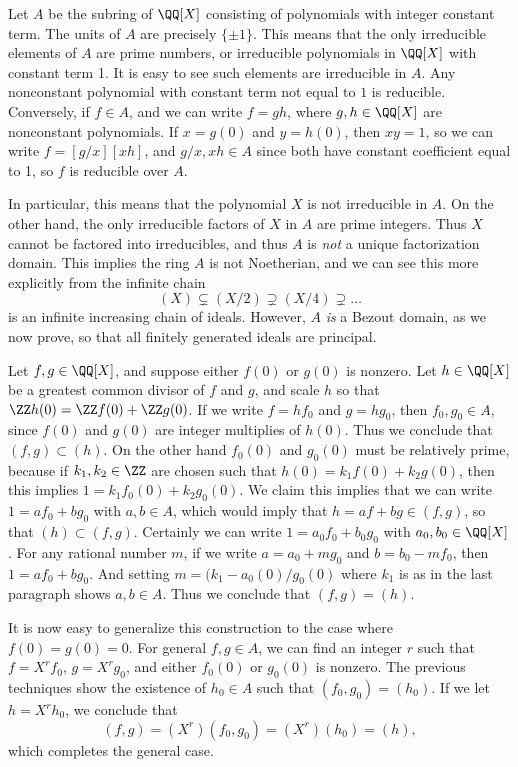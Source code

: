 \begin{example}
    Let $A$ be the subring of $\QQ[X]$ consisting of polynomials with integer constant term. The units of $A$ are precisely $\{ \pm 1 \}$. This means that the only irreducible elements of $A$ are prime numbers, or irreducible polynomials in $\QQ[X]$ with constant term 1. It is easy to see such elements are irreducible in $A$. Any nonconstant polynomial with constant term not equal to $1$ is reducible. Conversely, if $f \in A$, and we can write $f = gh$, where $g,h \in \QQ[X]$ are nonconstant polynomials. If $x = g(0)$ and $y = h(0)$, then $xy = 1$, so we can write $f = [g/x][xh]$, and $g/x,xh \in A$ since both have constant coefficient equal to 1, so $f$ is reducible over $A$.

    In particular, this means that the polynomial $X$ is not irreducible in $A$. On the other hand, the only irreducible factors of $X$ in $A$ are prime integers. Thus $X$ cannot be factored into irreducibles, and thus $A$ is \emph{not} a unique factorization domain. This implies the ring $A$ is not Noetherian, and we can see this more explicitly from the infinite chain
    \[ (X) \subsetneq (X/2) \supsetneq (X/4) \supsetneq \dots \]
    is an infinite increasing chain of ideals. However, $A$ \emph{is} a Bezout domain, as we now prove, so that all finitely generated ideals are principal.

    Let $f,g \in \QQ[X]$, and suppose either $f(0)$ or $g(0)$ is nonzero. Let $h \in \QQ[X]$ be a greatest common divisor of $f$ and $g$, and scale $h$ so that $\ZZ h(0) = \ZZ f(0) + \ZZ g(0)$. If we write $f = hf_0$ and $g = hg_0$, then $f_0, g_0 \in A$, since $f(0)$ and $g(0)$ are integer multiplies of $h(0)$. Thus we conclude that $(f,g) \subset (h)$. On the other hand $f_0(0)$ and $g_0(0)$ must be relatively prime, because if $k_1,k_2 \in \ZZ$ are chosen such that $h(0) = k_1 f(0) + k_2g(0)$, then this implies $1 = k_1 f_0(0) + k_2 g_0(0)$. We claim this implies that we can write $1 = a f_0 + b g_0$ with $a,b \in A$, which would imply that $h = af + bg \in (f,g)$, so that $(h) \subset (f,g)$. Certainly we can write $1 = a_0 f_0 + b_0 g_0$ with $a_0,b_0 \in \QQ[X]$. For any rational number $m$, if we write $a = a_0 + mg_0$ and $b = b_0 - mf_0$, then $1 = af_0 + bg_0$. And setting $m = (k_1 - a_0(0) / g_0(0)$ where $k_1$ is as in the last paragraph shows $a,b \in A$. Thus we conclude that $(f,g) = (h)$.

    It is now easy to generalize this construction to the case where $f(0) = g(0) = 0$. For general $f,g \in A$, we can find an integer $r$ such that $f = X^r f_0$, $g = X^r g_0$, and either $f_0(0)$ or $g_0(0)$ is nonzero. The previous techniques show the existence of $h_0 \in A$ such that $(f_0,g_0) = (h_0)$. If we let $h = X^r h_0$, we conclude that
    \[ (f,g) = (X^r) (f_0,g_0) = (X^r) (h_0) = (h), \]
    which completes the general case.
\end{example}


